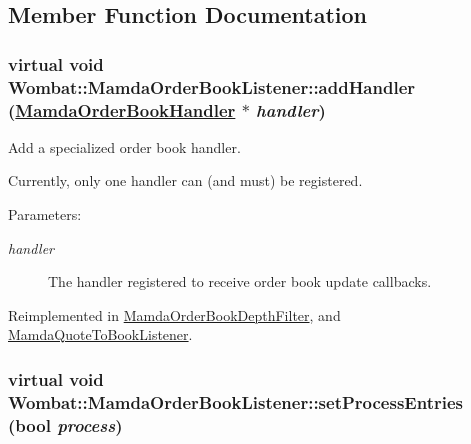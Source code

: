 \subsection{Member Function Documentation}
\hypertarget{classWombat_1_1MamdaOrderBookListener_81c34135bae76175b72fed83c3a6325c}{
\subsubsection[addHandler]{\setlength{\rightskip}{0pt plus 5cm}virtual void Wombat::Mamda\-Order\-Book\-Listener::add\-Handler (\hyperlink{classWombat_1_1MamdaOrderBookHandler}{Mamda\-Order\-Book\-Handler} $\ast$ {\em handler})}}
\label{classWombat_1_1MamdaOrderBookListener_81c34135bae76175b72fed83c3a6325c}


Add a specialized order book handler. 

Currently, only one handler can (and must) be registered.

\begin{Desc}
\item[Parameters:]
\begin{description}
\item[{\em handler}]The handler registered to receive order book update callbacks. \end{description}
\end{Desc}


Reimplemented in \hyperlink{classMamdaOrderBookDepthFilter_60862fa9b9c5835445940630b5f982d6}{Mamda\-Order\-Book\-Depth\-Filter}, and \hyperlink{classMamdaQuoteToBookListener_f789fd04752b2c25b04daa6888c33388}{Mamda\-Quote\-To\-Book\-Listener}.\hypertarget{classWombat_1_1MamdaOrderBookListener_318470f5c5cf4e2873f470610631145f}{
\subsubsection[setProcessEntries]{\setlength{\rightskip}{0pt plus 5cm}virtual void Wombat::Mamda\-Order\-Book\-Listener::set\-Process\-Entries (bool {\em process})}}
\label{classWombat_1_1MamdaOrderBookListener_318470f5c5cf4e2873f470610631145f}



